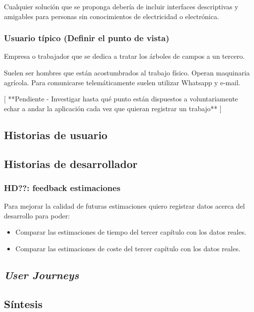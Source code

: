 Cualquier solución que se proponga debería de incluir interfaces
descriptivas y amigables para personas sin conocimientos de
electricidad o electrónica.

\subsubsection{Usuario típico (Definir el punto de vista)}

Empresa o trabajador que se dedica a tratar los árboles de campos a un tercero.

Suelen ser hombres que están acostumbrados al trabajo físico. Operan maquinaria
agrícola. Para comunicarse telemáticamente suelen utilizar Whatsapp y e-mail.

[ **Pendiente - Investigar hasta qué punto están dispuestos a voluntariamente
echar a andar la aplicación cada vez que quieran registrar un trabajo** ]

\subsection{Historias de usuario}

\subsection{Historias de desarrollador}

\subsubsection{HD??: feedback estimaciones}
Para mejorar la calidad de futuras estimaciones quiero registrar datos acerca del desarrollo
para poder:

\begin{itemize}
   \item Comparar las estimaciones de tiempo del tercer capítulo con los datos reales.
   \item Comparar las estimaciones de coste del tercer capítulo con los datos reales.
\end{itemize}

\subsection{\textit{User Journeys}}

\subsection{Síntesis}

